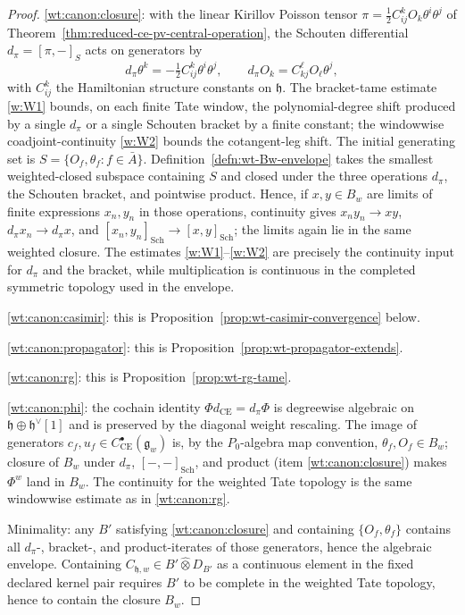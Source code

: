 \begin{proof}
  \ref{wt:canon:closure}: with the linear Kirillov Poisson tensor
  $\pi=\tfrac12 C^k_{ij}O_k\theta^i\theta^j$ of
  Theorem~\ref{thm:reduced-ce-pv-central-operation}, the Schouten
  differential $d_\pi=[\pi,-]_S$ acts on generators by
  \[
    d_\pi\theta^k=-\tfrac12C^k_{ij}\theta^i\theta^j,\qquad
    d_\pi O_k=C^\ell_{kj}O_\ell\theta^j,
  \]
  with $C^k_{ij}$ the Hamiltonian structure constants on $\mathfrak h$.
  The bracket-tame estimate \ref{w:W1} bounds, on each finite Tate
  window, the polynomial-degree shift produced by a single $d_\pi$ or a
  single Schouten bracket by a finite constant; the windowwise
  coadjoint-continuity \ref{w:W2} bounds the cotangent-leg shift.
  The initial generating set is
  \(S=\{O_f,\theta_f:f\in\bar A\}\).  Definition~\ref{defn:wt-Bw-envelope}
  takes the smallest weighted-closed subspace containing \(S\) and
  closed under the three operations \(d_\pi\), the Schouten bracket, and
  pointwise product.  Hence, if \(x,y\in B_w\) are limits of finite
  expressions \(x_n,y_n\) in those operations, continuity gives
  \(x_ny_n\to xy\), \(d_\pi x_n\to d_\pi x\), and
  \([x_n,y_n]_{\mathrm{Sch}}\to[x,y]_{\mathrm{Sch}}\); the limits again
  lie in the same weighted closure.  The estimates
  \ref{w:W1}--\ref{w:W2} are precisely the continuity input for
  \(d_\pi\) and the bracket, while multiplication is continuous in the
  completed symmetric topology used in the envelope.

  \ref{wt:canon:casimir}: this is
  Proposition~\ref{prop:wt-casimir-convergence} below.

  \ref{wt:canon:propagator}: this is
  Proposition~\ref{prop:wt-propagator-extends}.

  \ref{wt:canon:rg}: this is Proposition~\ref{prop:wt-rg-tame}.

  \ref{wt:canon:phi}: the cochain identity
  $\Phi d_{\mathrm{CE}}=d_\pi\Phi$ is degreewise algebraic on
  $\mathfrak h\oplus\mathfrak h^\vee[1]$ and is preserved by the
  diagonal weight rescaling. The image of generators
  $c_f,u_f\in C^\bullet_{\mathrm{CE}}(\mathfrak g_w)$ is, by the
  $P_0$-algebra map convention,
  $\theta_f,O_f\in B_w$; closure of $B_w$ under $d_\pi$,
  $[-,-]_{\mathrm{Sch}}$, and product (item \ref{wt:canon:closure}) makes
  $\Phi^w$ land in $B_w$. The continuity for the weighted Tate topology
  is the same windowwise estimate as in \ref{wt:canon:rg}.

  Minimality: any $B'$ satisfying \ref{wt:canon:closure} and containing
  $\{O_f,\theta_f\}$ contains all $d_\pi$-, bracket-, and
  product-iterates of those generators, hence the algebraic envelope.
  Containing
  \(C_{\mathfrak h,w}\in B'\widehat\otimes D_{B'}\) as a continuous
  element in the fixed declared kernel pair requires \(B'\) to be
  complete in the weighted Tate topology, hence to contain the closure
  \(B_w\).
\end{proof}


